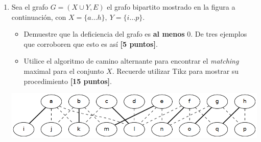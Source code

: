 \documentclass[legalpaper,10pt]{article}
\begin{document}
\begin{enumerate}[1)]
\rule{5cm}{0.4pt}

\underline{\textbf{Respuesta:}}

Primero comenzamos coloreando el grafo. Nos podemos fijar que hay un grafo completo de tamaño 4, esto ya nos da una pista que nos dice que hay que usar al menos 4 colores. También podemos ver ciclos de grado par e impar, pero no son mas complejos que el grafo completo anterior. Por lo tanto, su numero cromático debería ser 4.


\[\shadowbox{\(\displaystyle \chi (G) = 4 \)}\blacksquare\]

\vspace{3em}

Debería existir un \(n\) tal que \(K_n \subseteq G\), pero como podemos ver, existen \(K_3\) dentro del grafo, y lo mas complejo que se puede encontrar es un grafo \(K_4\), en otras palabras, lo mas que puede ser \(n\) es 4.


Y como ya vimos antes, \(\chi (G) = 4\), entonces si se cumple que \(n \leq \chi (G)\). \hfill \(\blacksquare\)



\newpage






\item Sea el grafo \(G = (X \cup Y, E)\) el grafo bipartito mostrado en la figura a continuación, con \(X = \{a \dots h\}, \ Y = \{ i \dots p \}\).
  \begin{itemize}
    \item Demuestre que la deficiencia del grafo es \textbf{al menos} 0. De tres ejemplos que corroboren que esto es así \textbf{[5 puntos]}.
    \item Utilice el algoritmo de camino alternante para encontrar el \emph{matching} maximal para el conjunto \(X\). Recuerde utilizar Tikz para mostrar su procedimiento \textbf{[15 puntos]}.
  \end{itemize}

  \begin{center}
    \includegraphics[scale=0.45]{./figure2.png}
  \end{center}


\end{enumerate}
\end{document}
